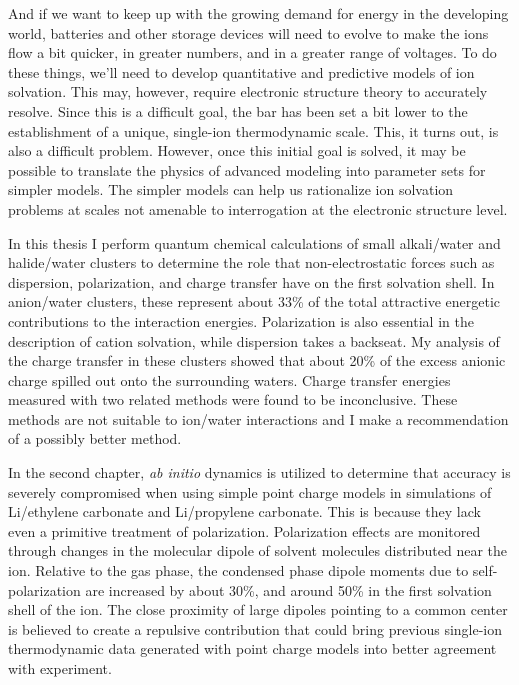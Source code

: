 \begin{intro}
   And if we want to keep up with the growing demand for energy in the developing world, batteries and other storage devices will need to evolve to make the ions flow a bit 
   quicker, in greater numbers, and in a greater range of voltages. To do these things, we'll need to develop quantitative and predictive models of ion solvation. This may,
   however, require electronic structure theory to accurately resolve. Since this is a difficult goal, the bar has been set a bit lower to the establishment of a unique, 
   single-ion thermodynamic scale. This, it turns out, is also a difficult problem. However, once this initial goal is solved, it may be possible to translate the physics 
   of advanced modeling into parameter sets for simpler models. The simpler models can help us rationalize ion solvation problems at scales not amenable to interrogation 
   at the electronic structure level.
   
   In this thesis I perform quantum chemical calculations of small alkali/water and halide/water clusters to determine the role that non-electrostatic forces such as dispersion,
   polarization, and charge transfer have on the first solvation shell. In anion/water clusters, these represent about 33\% of the total attractive energetic contributions to
   the interaction energies. Polarization is also essential in the description of cation solvation, while dispersion takes a backseat. My analysis of the charge transfer in 
   these clusters showed that about 20\% of the excess anionic charge spilled out onto the surrounding waters. Charge transfer energies measured with two related methods were 
   found to be inconclusive. These methods are not suitable to ion/water interactions and I make a recommendation of a possibly better method. 
   
   In the second chapter, \emph{ab initio} dynamics is utilized to determine that accuracy is severely compromised when using simple point charge models in simulations of Li\sur{+}/ethylene
   carbonate and Li\sur{+}/propylene carbonate. This is because they lack even a primitive treatment of polarization. Polarization effects are monitored through changes in
   the molecular dipole of solvent molecules distributed near the ion. Relative to the gas phase, the condensed phase dipole moments due to self-polarization are increased by 
   about 30\%, and around 50\% in the first solvation shell of the ion. The close proximity of large dipoles pointing to a common center is believed to create a repulsive 
   contribution that could bring previous single-ion thermodynamic data generated with point charge models into better agreement with experiment.
   

\end{intro}
